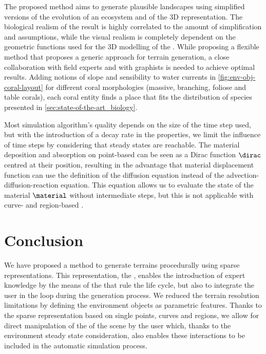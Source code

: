 The proposed method aims to generate plausible landscapes using simplified versions of the evolution of an ecosystem and of the 3D representation. The biological realism of the result is highly correlated to the amount of simplification and assumptions, while the visual realism is completely dependent on the geometric functions used for the 3D modelling of the . While proposing a flexible method that proposes a generic approach for terrain generation, a close collaboration with field experts and with graphists is needed to achieve optimal results. Adding notions of slope and sensibility to water currents in \cref{fig:env-obj-coral-layout} for different coral morphologies (massive, branching, foliose and table corals), each coral entity finds a place that fits the distribution of species presented in \cref{sec:state-of-the-art_biology}. 

Most simulation algorithm's quality depends on the size of the time step used, but with the introduction of a decay rate in the  properties, we limit the influence of time steps by considering that steady states are reachable. The material deposition and absorption on point-based  can be seen as a Dirac function $\dirac$ centred at their position, resulting in the advantage that material displacement function can use the definition of the diffusion equation instead of the advection-diffusion-reaction equation. This equation allows us to evaluate the state of the material $\material$ without intermediate steps, but this is not applicable with curve- and region-based .


\section{Conclusion}
\label{sec:env-obj-conclusion}
We have proposed a method to generate terrains procedurally using sparse representations. This representation, the , enables the introduction of expert knowledge by the means of the  that rule the  life cycle, but also to integrate the user in the loop during the generation process. We reduced the terrain resolution limitations by defining the environment objects as parametric features. Thanks to the sparse representation based on single points, curves and regions, we allow for direct manipulation of the  of the scene by the user which, thanks to the environment steady state consideration, also enables these interactions to be included in the automatic simulation process.

